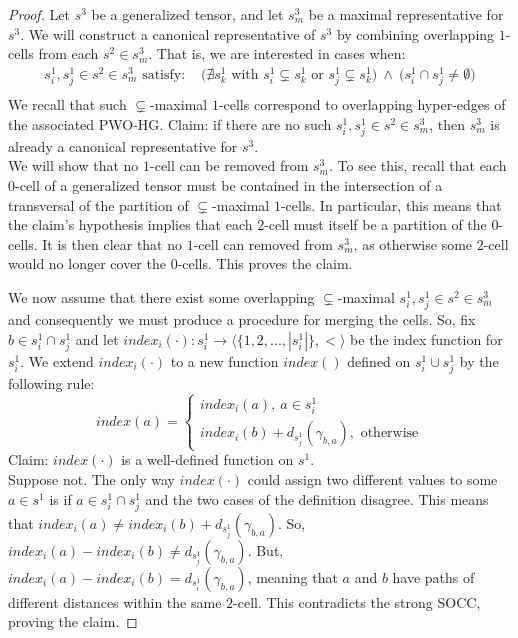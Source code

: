 \documentclass{article}
\theoremstyle{plain}
\theoremstyle{definition}
\theoremstyle{remark}
\begin{document}
\begin{proof}
	Let $s^3$ be a generalized tensor, and let $s^3_m$ be a maximal representative for $s^3$. We will construct a canonical representative of $s^3$ by combining overlapping $1$-cells from each $s^2 \in s^3_m$. That is, we are interested in cases when:
	\begin{equation*}
		\begin{aligned}
			s^1_i, s^1_j \in s^2 \in s^3_m \text{ satisfy: }& \big( \nexists s^1_k \text{ with } s^1_i \subsetneq s^1_k \text{ or } s^1_j \subsetneq s^1_k \big) \ \wedge \ \big( s^1_i \cap s^1_j \neq \emptyset \big)\\
		\end{aligned}
	\end{equation*}
	We recall that such $\subsetneq$-maximal $1$-cells correspond to overlapping hyper-edges of the associated PWO-HG.
	Claim: if there are no such $s^1_i, s^1_j \in s^2 \in s^3_m$, then $s^3_m$ is already a canonical representative for $s^3$.\\
	We will show that no $1$-cell can be removed from $s^3_m$. To see this, recall that each $0$-cell of a generalized tensor must be contained in the intersection of a transversal of the partition of $\subsetneq$-maximal $1$-cells. In particular, this means that the claim's hypothesis implies that each $2$-cell must itself be a partition of the $0$-cells. It is then clear that no $1$-cell can removed from $s^3_m$, as otherwise some $2$-cell would no longer cover the $0$-cells. This proves the claim.
	
	We now assume that there exist some overlapping $\subsetneq$-maximal $s^1_i, s^1_j \in s^2 \in s^3_m$ and consequently we must produce a procedure for merging the cells. So, fix $b \in s^1_i \cap s^1_j$ and let $index_i(\cdot): s^1_i \rightarrow \big \langle \{1, 2, ..., |s^1_i|\}, < \big \rangle$ be the index function for $s^1_i$. We extend $index_i(\cdot)$ to a new function $index()$ defined on $s^1_i \cup s^1_j$ by the following rule:
	\begin{equation*}
		index(a) = \begin{cases}
			index_i(a), \ a \in s^1_i\\
			index_i(b) + d_{s^1_j}(\gamma_{b, a}), \text{ otherwise}
		\end{cases}
	\end{equation*}
	Claim: $index(\cdot)$ is a well-defined function on $s^1$.\\
	Suppose not. The only way $index(\cdot)$ could assign two different values to some $a \in s^1$ is if $a \in s^1_i \cap s^1_j$ and the two cases of the definition disagree. This means that $index_i(a) \neq index_i(b) + d_{s^1_j}(\gamma_{b, a})$. So, $index_i(a) - index_i(b) \neq d_{s^1_j}(\gamma_{b, a})$. But, $index_i(a) - index_i(b) = d_{s^1_i}(\gamma_{b, a})$, meaning that $a$ and $b$ have paths of different distances within the same $2$-cell. This contradicts the strong SOCC, proving the claim.
	

\end{proof}
\end{document}
